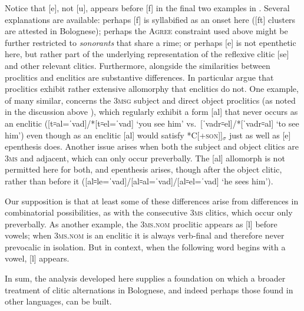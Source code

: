 \documentclass[output=paper,colorlinks,citecolor=brown]{langscibook}
\begin{document}
Notice that [e], not [u], appears before [f] in the final two examples in .  Several explanations are available: perhaps [f] is syllabified as an onset here ([ft] clusters are attested in Bolognese); perhaps the \textsc{Agree} constraint used above might be further restricted to \emph{sonorants} that share a rime; or perhaps [e] is not epenthetic here, but rather part of the underlying representation of the reflexive clitic [se] and other relevant clitics.  Furthermore, alongside the similarities between proclitics and enclitics are substantive differences.  In particular \citet{rubinkaplanallomorphywithls} argue that proclitics exhibit rather extensive allomorphy that enclitics do not. %
One example, of many similar, concerns the 3\textsc{msg} subject and direct object proclitics (as noted in the discussion above ), which regularly exhibit a form [al] that never occurs as an enclitic ([t꞊al=ˈvad]/*[t꞊el=ˈvad] `you see him' vs.\ [ˈvadr꞊el]/*[ˈvadr꞊al] `to see him') even though as an enclitic [al] would satisfy \textsc{*C[+\textsc{son}]]$_\sigma$} just as well as [e] epenthesis does. Another issue arises when both the subject and object clitics are 3\textsc{ms} and adjacent, which can only occur preverbally. The [al] allomorph is not permitted here for both, and epenthesis arises, though after the object clitic, rather than before it ([al꞊le=ˈvad]\slash *[al꞊al=ˈvad]\slash *[al꞊el=ˈvad] `he sees him').

Our supposition is that at least some of these differences arise from differences in combinatorial possibilities, as with the consecutive 3\textsc{ms} clitics, which occur only preverbally.  As another example, the 3\textsc{ms.nom} proclitic appears as [l] before vowels; when 3\textsc{ms.nom} is an enclitic it is always verb-final and therefore never prevocalic in isolation.  But in context, when the following word begins with a vowel, [l] appears.%

In sum, the analysis developed here supplies a foundation on which a broader treatment of clitic alternations in Bolognese, and indeed perhaps those found in other languages, can be built.
\end{document}
